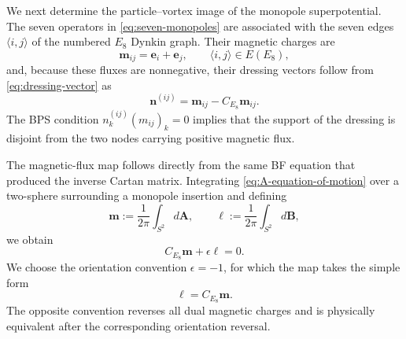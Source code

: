 \documentclass[11pt,a4paper]{article}
\numberwithin{equation}{section}
\begin{document}
We next determine the particle--vortex image of the monopole superpotential.  The seven operators in \eqref{eq:seven-monopoles} are associated with the seven edges $\langle i,j\rangle$ of the numbered $E_8$ Dynkin graph.  Their magnetic charges are
\begin{equation}
  \boldsymbol m_{ij}
  =\boldsymbol e_i+\boldsymbol e_j,
  \qquad
  \langle i,j\rangle\in E(E_8),
  \label{eq:edge-magnetic-charges}
\end{equation}
and, because these fluxes are nonnegative, their dressing vectors follow from \eqref{eq:dressing-vector} as
\begin{equation}
  \boldsymbol n^{(ij)}
  =\boldsymbol m_{ij}-C_{E_8}\boldsymbol m_{ij}.
  \label{eq:edge-original-dressing}
\end{equation}
The BPS condition $n_k^{(ij)}(m_{ij})_k=0$ implies that the support of the dressing is disjoint from the two nodes carrying positive magnetic flux.

The magnetic-flux map follows directly from the same BF equation that produced the inverse Cartan matrix.  Integrating \eqref{eq:A-equation-of-motion} over a two-sphere surrounding a monopole insertion and defining
\begin{equation}
  \boldsymbol m
  :=\frac{1}{2\pi}\int_{S^2}d\boldsymbol A,
  \qquad
  \boldsymbol\ell
  :=\frac{1}{2\pi}\int_{S^2}d\boldsymbol B,
  \label{eq:original-dual-flux-definitions}
\end{equation}
we obtain
\begin{equation}
  C_{E_8}\boldsymbol m+\epsilon\boldsymbol\ell=0.
  \label{eq:BF-flux-equation}
\end{equation}
We choose the orientation convention $\epsilon=-1$, for which the map takes the simple form
\begin{equation}
  \boldsymbol\ell=C_{E_8}\boldsymbol m.
  \label{eq:PV-magnetic-map}
\end{equation}
The opposite convention reverses all dual magnetic charges and is physically equivalent after the corresponding orientation reversal.
\end{document}
